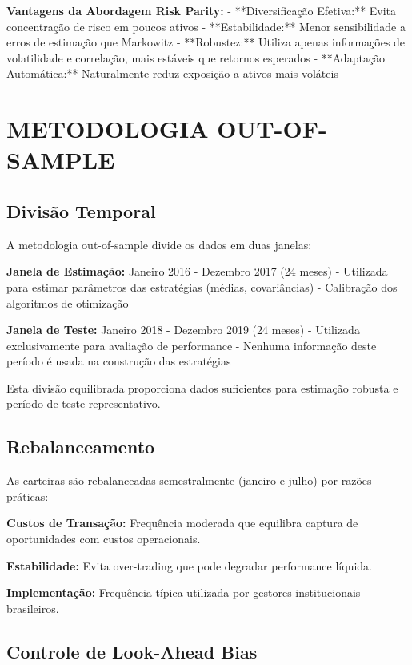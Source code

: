 \textbf{Vantagens da Abordagem Risk Parity:}
- **Diversificação Efetiva:** Evita concentração de risco em poucos ativos
- **Estabilidade:** Menor sensibilidade a erros de estimação que Markowitz
- **Robustez:** Utiliza apenas informações de volatilidade e correlação, mais estáveis que retornos esperados
- **Adaptação Automática:** Naturalmente reduz exposição a ativos mais voláteis

\section{METODOLOGIA OUT-OF-SAMPLE}

\subsection{Divisão Temporal}

A metodologia out-of-sample divide os dados em duas janelas:

\textbf{Janela de Estimação:} Janeiro 2016 - Dezembro 2017 (24 meses)
- Utilizada para estimar parâmetros das estratégias (médias, covariâncias)
- Calibração dos algoritmos de otimização

\textbf{Janela de Teste:} Janeiro 2018 - Dezembro 2019 (24 meses)  
- Utilizada exclusivamente para avaliação de performance
- Nenhuma informação deste período é usada na construção das estratégias

Esta divisão equilibrada proporciona dados suficientes para estimação robusta e período de teste representativo.

\subsection{Rebalanceamento}

As carteiras são rebalanceadas semestralmente (janeiro e julho) por razões práticas:

\textbf{Custos de Transação:} Frequência moderada que equilibra captura de oportunidades com custos operacionais.

\textbf{Estabilidade:} Evita over-trading que pode degradar performance líquida.

\textbf{Implementação:} Frequência típica utilizada por gestores institucionais brasileiros.

\subsection{Controle de Look-Ahead Bias}

